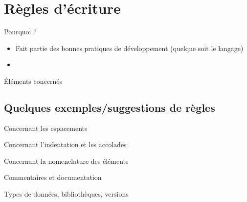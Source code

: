 
\section{Règles d’écriture}

\begin{frame}{Pourquoi ?}
\begin{itemize}
\item Fait partie des bonnes pratiques de développement (quelque soit le langage)
\item 
\end{itemize}
\end{frame}

\begin{frame}{Éléments concernés}

\end{frame}

\subsection{Quelques exemples/suggestions de règles}

\begin{frame}{Concernant les espacements}

\end{frame}

\begin{frame}{Concernant l’indentation et les accolades}

\end{frame}

\begin{frame}{Concernant la nomenclature des éléments}

\end{frame}

\begin{frame}{Commentaires et documentation}

\end{frame}

\begin{frame}{Types de données, bibliothèques, versions}

\end{frame}

